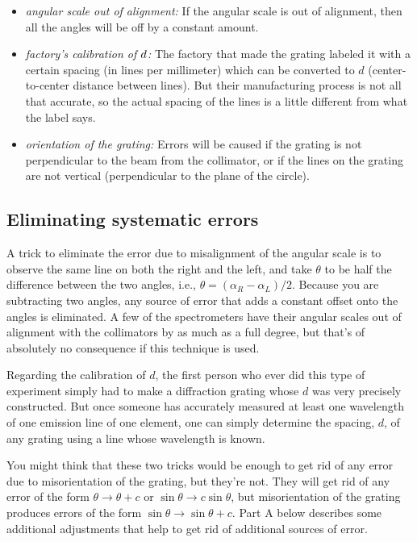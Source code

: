 \begin{itemize}
\item[] \emph{angular scale out of alignment:\/} If the angular scale is out
of alignment, then all the angles will be off by a constant amount.

\item[] \emph{factory's calibration of $d\/$:\/} The factory that made the
grating labeled it with a certain spacing (in lines per
millimeter) which can be converted to $d$ (center-to-center
distance between lines). But their manufacturing process is
not all that accurate, so the actual spacing of the lines is
a little different from what the label says.

\item[] \emph{orientation of the grating:\/} Errors will be caused if the grating
is not perpendicular to the beam from the collimator, or if the lines on the
grating are not vertical (perpendicular to the plane of the circle).
\end{itemize}

\subsection*{Eliminating systematic errors}

A trick to eliminate the error due to 
misalignment of the angular scale is to observe the same line on both the
right and the left, and take $\theta$ to be half the difference
between the two angles, i.e., $\theta=(\alpha_R-\alpha_L)/2$.
Because you are subtracting two angles, any source of error
that adds a constant offset onto the angles is eliminated.
A few of the spectrometers have their angular scales out of alignment
with the collimators by as much as a full degree, but that's of
absolutely no consequence if this technique is used.

Regarding the calibration of $d$, 
the first person who ever did this type of experiment simply
had to make a diffraction grating whose $d$ was very precisely
constructed. But once someone
has accurately measured at least one wavelength of one
emission line of one element, one can simply
determine the spacing, $d$, of any grating using a line
whose wavelength is known.

You might think that these two tricks would be enough to get rid
of any error due to misorientation of the grating, but they're not.
They will get rid of any error of the form $\theta\rightarrow\theta+c$
or $\sin\theta\rightarrow c\sin\theta$, but misorientation of the grating
produces errors of the form $\sin\theta\rightarrow\sin\theta+c$.
Part A below describes some additional adjustments that help
to get rid of additional sources of error.

